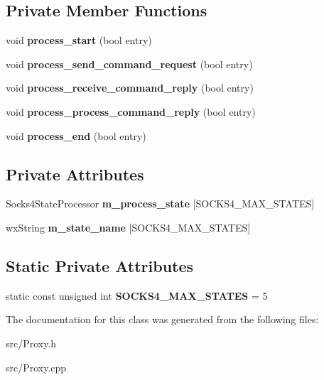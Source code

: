 \subsection*{Private Member Functions}
\begin{DoxyCompactItemize}
\item 
void {\bfseries process\_\-start} (bool entry)\label{classCSocks4StateMachine_a057e8f1af05010cc227040e777e94604}

\item 
void {\bfseries process\_\-send\_\-command\_\-request} (bool entry)\label{classCSocks4StateMachine_ab286829889ee9318601f4034789ff02e}

\item 
void {\bfseries process\_\-receive\_\-command\_\-reply} (bool entry)\label{classCSocks4StateMachine_ac2071abd0470c6ff2d22807986b2e6ea}

\item 
void {\bfseries process\_\-process\_\-command\_\-reply} (bool entry)\label{classCSocks4StateMachine_aca7089acc5e7a64cb237de62378e5125}

\item 
void {\bfseries process\_\-end} (bool entry)\label{classCSocks4StateMachine_a75b2aae93145b854c75967e1c15e5ded}

\end{DoxyCompactItemize}
\subsection*{Private Attributes}
\begin{DoxyCompactItemize}
\item 
Socks4StateProcessor {\bfseries m\_\-process\_\-state} [SOCKS4\_\-MAX\_\-STATES]\label{classCSocks4StateMachine_a6449526e45e844c9ee4e4e8606d47a4d}

\item 
wxString {\bfseries m\_\-state\_\-name} [SOCKS4\_\-MAX\_\-STATES]\label{classCSocks4StateMachine_ae6a1823b0b56d4f1f25aedf23a9f6055}

\end{DoxyCompactItemize}
\subsection*{Static Private Attributes}
\begin{DoxyCompactItemize}
\item 
static const unsigned int {\bfseries SOCKS4\_\-MAX\_\-STATES} = 5\label{classCSocks4StateMachine_a94972d47ad84eead308fd8e8088f0733}

\end{DoxyCompactItemize}


The documentation for this class was generated from the following files:\begin{DoxyCompactItemize}
\item 
src/Proxy.h\item 
src/Proxy.cpp\end{DoxyCompactItemize}
